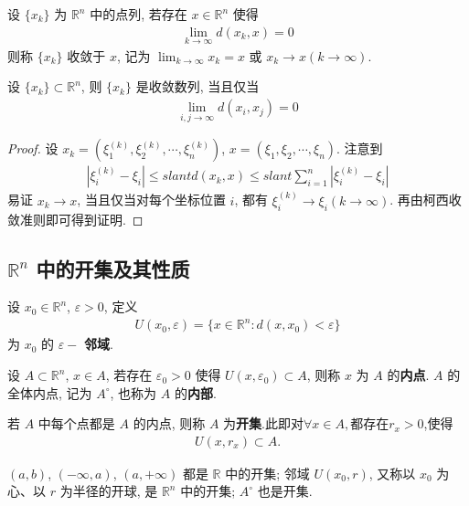 \documentclass[../../main.tex]{subfiles}
\begin{document}
\begin{definition}
设 $\{x_k\}$ 为 $\mathbb{R}^n$ 中的点列, 若存在 $x \in \mathbb{R}^n$ 使得
\begin{align*}
\lim_{k \to \infty} d(x_k, x) = 0
\end{align*}
则称 $\{x_k\}$ 收敛于 $x$, 记为 $\lim_{k \to \infty} x_k = x$ 或 $x_k \to x (k \to \infty)$.
\end{definition}

\begin{proposition}
设 $\{x_k\} \subset \mathbb{R}^n$, 则 $\{x_k\}$ 是收敛数列, 当且仅当
\begin{align*}
\lim_{i, j \to \infty} d(x_i, x_j) = 0
\end{align*} 
\end{proposition}
\begin{proof}
设 $x_k = (\xi_1^{(k)}, \xi_2^{(k)}, \cdots, \xi_n^{(k)})$, $x = (\xi_1, \xi_2, \cdots, \xi_n)$. 注意到
\begin{align*}
|\xi_i^{(k)} - \xi_i| \leqslant slant d(x_k, x) \leqslant slant \sum_{i = 1}^{n}|\xi_i^{(k)} - \xi_i|
\end{align*}
易证 $x_k \to x$, 当且仅当对每个坐标位置 $i$, 都有 $\xi_i^{(k)} \to \xi_i (k \to \infty)$. 再由柯西收敛准则即可得到证明.
\end{proof}

\subsection{$\mathbb{R}^n$ 中的开集及其性质} 

\begin{definition}[邻域、内点、内部和开集]
设 $x_0 \in \mathbb{R}^n$, $\varepsilon > 0$, 定义
\begin{align*}
U(x_0, \varepsilon) = \{x \in \mathbb{R}^n : d(x, x_0) < \varepsilon\}
\end{align*}
为 $x_0$ 的 $\varepsilon -$ \textbf{邻域}.

设 $A \subset \mathbb{R}^n$, $x \in A$, 若存在 $\varepsilon_0 > 0$ 使得 $U(x, \varepsilon_0) \subset A$, 则称 $x$ 为 $A$ 的\textbf{内点}. $A$ 的全体内点, 记为 $A^\circ$, 也称为 $A$ 的\textbf{内部}.

若 $A$ 中每个点都是 $A$ 的内点, 则称 $A$ 为\textbf{开集}.此即对$\forall x\in A,$都存在$r_x>0$,使得
\begin{align*}
U(x,r_x)\subset A.
\end{align*}
\end{definition}
\begin{note}
$(a, b)$, $(-\infty, a)$, $(a, +\infty)$ 都是 $\mathbb{R}$ 中的开集; 邻域 $U(x_0, r)$, 又称以 $x_0$ 为心、以 $r$ 为半径的开球, 是 $\mathbb{R}^n$ 中的开集; $A^\circ$ 也是开集.
\end{note}
\end{document}
